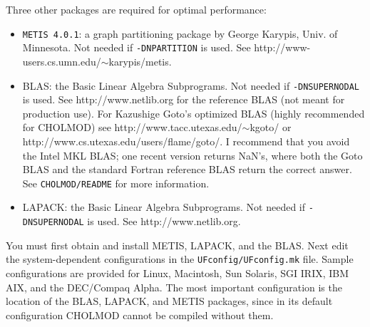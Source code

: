 \documentclass[11pt]{article}
\begin{document}
Three other packages are required for optimal performance:
\begin{itemize}
\item {\tt METIS 4.0.1}: a graph partitioning package by George Karypis,
    Univ. of Minnesota.  Not needed if {\tt -DNPARTITION} is used.
    See http://www-users.cs.umn.edu/$\sim$karypis/metis.
\item BLAS: the Basic Linear Algebra Subprograms.
    Not needed if {\tt -DNSUPERNODAL} is used.
    See http://www.netlib.org for the reference BLAS (not meant for production
    use).  For Kazushige Goto's optimized BLAS (highly recommended for CHOLMOD)
    see \newline
    http://www.tacc.utexas.edu/$\sim$kgoto/ or
    http://www.cs.utexas.edu/users/flame/goto/.
    I recommend that you avoid the Intel MKL BLAS; one recent
    version returns NaN's, where both the Goto BLAS and the standard
    Fortran reference BLAS return the correct answer.
    See {\tt CHOLMOD/README} for more information.
\item LAPACK: the Basic Linear Algebra Subprograms.
    Not needed if {\tt -DNSUPERNODAL} is used.
    See http://www.netlib.org.
\end{itemize}

You must first obtain and install METIS, LAPACK, and the BLAS.
Next edit the system-dependent configurations in the
{\tt UFconfig/UFconfig.mk} file.  Sample configurations are provided
for Linux, Macintosh, Sun Solaris, SGI IRIX, IBM AIX, and the DEC/Compaq Alpha.
The most important configuration is the location of the BLAS, LAPACK, and METIS
packages, since in its default configuration CHOLMOD cannot be compiled without them.
\end{document}

